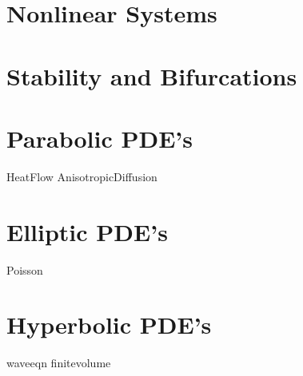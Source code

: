 \documentclass[nociteref]{SIAM-GH-book}
\begin{document}
\part{Nonlinear Systems}


\part{Stability and Bifurcations}


\part{Parabolic PDE's}
{HeatFlow}
{AnisotropicDiffusion}


\part{Elliptic PDE's}
 {Poisson}


\part{Hyperbolic PDE's}
{waveeqn}
{finitevolume}


% 
% 
% 
% 
% 
% 
\end{document}
